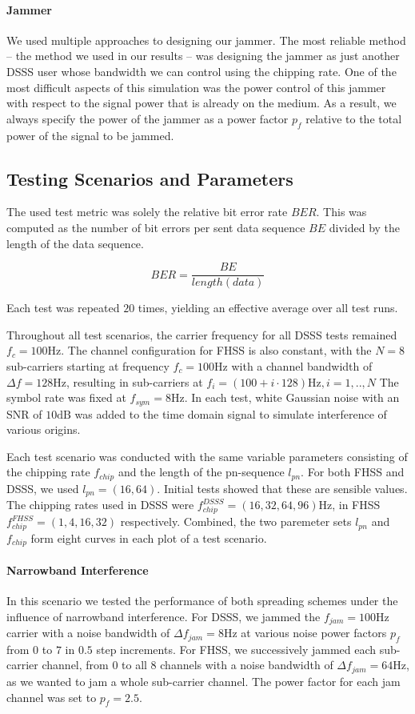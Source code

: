 	\paragraph{Jammer}
	We used multiple approaches to designing our jammer. The most reliable method -- the method we used in our results -- was designing the jammer as just another DSSS user whose bandwidth we can control using the chipping rate. One of the most difficult aspects of this simulation was the power control of this jammer with respect to the signal power that is already on the medium. As a result, we always specify the power of the jammer as a power factor $p_f$ relative to the total power of the signal to be jammed.
	
	\subsection{Testing Scenarios and Parameters}
	The used test metric was solely the relative bit error rate $BER$. This was computed as the number of bit errors per sent data sequence $BE$ divided by the length of the data sequence.
	
	\[
		BER = \frac{BE}{length(data)}
	\]
	
	Each test was repeated $20$ times, yielding an effective average over all test runs.
	
	Throughout all test scenarios, the carrier frequency for all DSSS tests remained $f_c = 100\text{Hz}$. The channel configuration for FHSS is also constant, with the $N=8$ sub-carriers starting at frequency $f_c = 100\text{Hz}$ with a channel bandwidth of $\Delta f = 128 \text{Hz}$, resulting in sub-carriers at $f_i = (100 + i \cdot 128)\text{Hz}, i=1,..,N$ The symbol rate was fixed at $f_{sym} = 8\text{Hz}$. In each test, white Gaussian noise with an SNR of $10\text{dB}$ was added to the time domain signal to simulate interference of various origins.
	
	Each test scenario was conducted with the same variable parameters consisting of the chipping rate $f_{chip}$ and the length of the pn-sequence $l_{pn}$. For both FHSS and DSSS, we used $l_{pn} = (16, 64)$. Initial tests showed that these are sensible values. The chipping rates used in DSSS were $f_{chip}^{DSSS} = (16,32,64,96)\text{Hz}$, in FHSS $f_{chip}^{FHSS} = (1, 4, 16, 32)$ respectively. Combined, the two paremeter sets $l_{pn}$ and $f_{chip}$ form eight curves in each plot of a test scenario.
	
	\paragraph{Narrowband Interference}
	In this scenario we tested the performance of both spreading schemes under the influence of narrowband interference. For DSSS, we jammed the $f_{jam} = 100\text{Hz}$ carrier with a noise bandwidth of $\Delta f_{jam} = 8\text{Hz}$ at various noise power factors $p_f$ from $0$ to $7$ in $0.5$ step increments. For FHSS, we successively jammed each sub-carrier channel, from $0$ to all $8$ channels with a noise bandwidth of $\Delta f_{jam} = 64\text{Hz}$, as we wanted to jam a whole sub-carrier channel. The power factor for each jam channel was set to $p_f = 2.5$.
	

